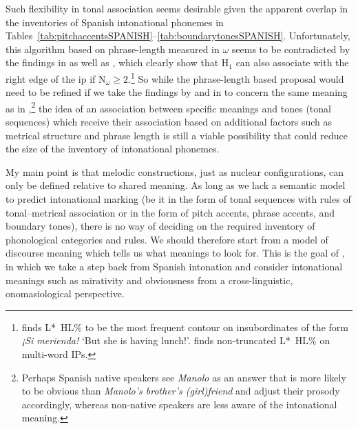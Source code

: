 Such flexibility in tonal association seems desirable given the apparent overlap in the inventories of Spanish intonational phonemes in Tables~\ref{tab:pitchaccentsSPANISH}--\ref{tab:boundarytonesSPANISH}. Unfortunately, this algorithm based on phrase-length measured in $\omega$ seems to be contradicted by the findings in \citet[142--143, 253--260]{ElviraGarcia.2016} as well as , which clearly show that H$_1$ can also associate with the right edge of the ip if N$_\omega \geq 2$.\footnote{\citet[142]{ElviraGarcia.2016} finds L*~HL\% to be the most frequent contour on insubordinates of the form \textit{¡Si merienda!} `But she is having lunch!'.  finds non-truncated L*~HL\% on multi-word \acp{IP}.} So while the phrase-length based proposal would need to be refined if we take the findings by \citet{ElviraGarcia.2016} and in  to concern the same meaning as in \citet{TorreiraGrice.2018},\footnote{Perhaps Spanish native speakers see \textit{Manolo} as an answer that is more likely to be obvious than \textit{Manolo's brother's (girl)friend} and adjust their prosody accordingly, whereas non-native speakers are less aware of the intonational meaning.} the idea of an association between specific meanings and tones (tonal sequences) which receive their association based on additional factors such as metrical structure and phrase length is still a viable possibility that could reduce the size of the inventory of intonational phonemes. 

My main point is that melodic constructions, just as nuclear configurations, can only be defined relative to shared meaning. As long as we lack a semantic model to predict intonational marking (be it in the form of tonal sequences with rules of tonal--metrical association or in the form of pitch accents, phrase accents, and boundary tones), there is no way of deciding on the required inventory of phonological categories and rules. We should therefore start from a model of discourse meaning which tells us what meanings to look for. This is the goal of , in which we take a step back from Spanish intonation and consider intonational meanings such as mirativity and obviousness from a cross-linguistic, onomasiological perspective.

